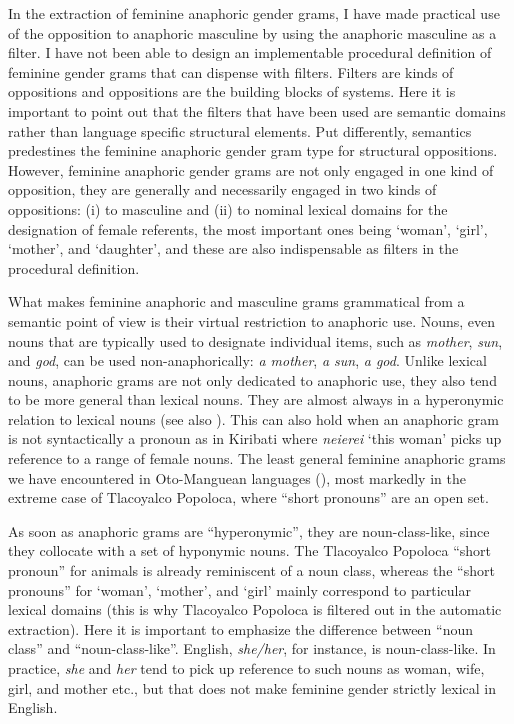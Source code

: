 \documentclass[output=collectionpaper]{langsci/langscibook}
\begin{document}
In the extraction of feminine anaphoric gender grams, I have made practical use of the opposition to anaphoric masculine by using the anaphoric masculine as a filter. I have not been able to design an implementable procedural definition of feminine gender grams that can dispense with filters. Filters are kinds of oppositions and oppositions are the building blocks of systems. Here it is important to point out that the filters that have been used are semantic domains rather than language specific structural elements. Put differently, semantics predestines the feminine anaphoric gender gram type for structural oppositions. However, feminine anaphoric gender grams are not only engaged in one kind of opposition, they are generally and necessarily engaged in two kinds of oppositions: (i) to masculine and (ii) to nominal lexical domains for the designation of female referents, the most important ones being ‘woman’, ‘girl’, ‘mother’, and ‘daughter’, and these are also indispensable as filters in the procedural definition.

What makes feminine anaphoric and masculine grams grammatical from a semantic point of view is their virtual restriction to anaphoric use. Nouns, even nouns that are typically used to designate individual items, such as \textit{mother}, \textit{sun}, and \textit{god}, can be used non-anaphorically: \textit{a mother}, \textit{a sun}, \textit{a god}. Unlike lexical nouns, anaphoric grams are not only dedicated to anaphoric use, they also tend to be more general than lexical nouns. They are almost always in a hyperonymic relation to lexical nouns (see also \citealt{Seifart2018}). This can also hold when an anaphoric gram is not syntactically a pronoun as in Kiribati where \textit{neierei} ‘this woman’ picks up reference to a range of female nouns. The least general feminine anaphoric grams we have encountered in Oto-Manguean languages (), most markedly in the extreme case of Tlacoyalco Popoloca, where “short pronouns” are an open set.

As soon as anaphoric grams are “hyperonymic”, they are noun-class-like, since they collocate with a set of hyponymic nouns. The Tlacoyalco Popoloca “short pronoun” for animals is already reminiscent of a noun class, whereas the “short pronouns” for ‘woman’, ‘mother’, and ‘girl’ mainly correspond to particular lexical domains (this is why Tlacoyalco Popoloca is filtered out in the automatic extraction). Here it is important to emphasize the difference between “noun class” and “noun-class-like”. English, \textit{she/her}, for instance, is noun-class-like. In practice, \textit{she} and \textit{her} tend to pick up reference to such nouns as woman, wife, girl, and mother etc., but that does not make feminine gender strictly lexical in English.
\end{document}
